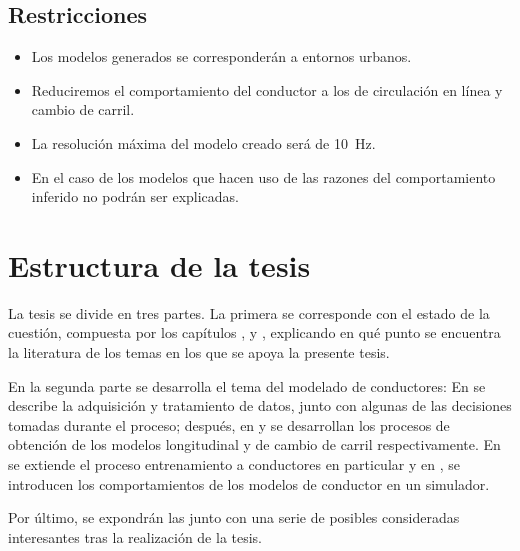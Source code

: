 \subsection{Restricciones}

\begin{itemize}
	\item Los modelos generados se corresponderán a entornos urbanos.
	\item Reduciremos el comportamiento del conductor a los de circulación en línea y cambio de carril.
	\item La resolución máxima del modelo creado será de \SI{10}{\hertz}.
	\item En el caso de los modelos que hacen uso de  las razones del comportamiento inferido no podrán ser explicadas.
\end{itemize}

\section{Estructura de la tesis}
\label{ch:intro:structure}


La tesis se divide en tres partes. La primera se corresponde con el estado de la cuestión, compuesta por los capítulos ,  y , explicando en qué punto se encuentra la literatura de los temas en los que se apoya la presente tesis.

En la segunda parte se desarrolla el tema del modelado de conductores: En  se describe la adquisición y tratamiento de datos, junto con algunas de las decisiones tomadas durante el proceso; después, en  y  se desarrollan los procesos de obtención de los modelos longitudinal y de cambio de carril respectivamente. En  se extiende el proceso entrenamiento a conductores en particular y en , se introducen los comportamientos de los modelos de conductor en un simulador.

Por último, se expondrán las  junto con una serie de posibles  consideradas interesantes tras la realización de la tesis.
